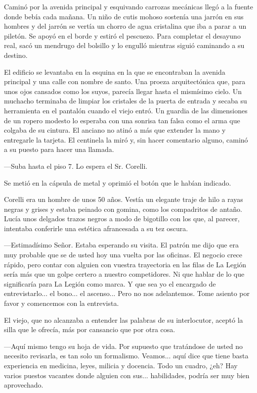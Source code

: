\documentclass[11pt,twoside,openright,a5paper]{book}
\begin{document}
Caminó por la avenida principal y esquivando carrozas mecánicas llegó a la fuente donde bebía cada mañana. Un niño de cutis mohoso sostenía una jarrón en sus hombres y del jarrón se vertía un chorro de agua cristalina que iba a parar a un piletón. Se apoyó en el borde y estiró el pescuezo. Para completar el desayuno real, sacó un mendrugo del bolsillo y lo engulló mientras siguió caminando a su destino.

El edificio se levantaba en la esquina en la que se encontraban la avenida principal y una calle con nombre de santo. Una proeza arquitectónica que, para unos ojos cansados como los suyos, parecía llegar hasta el mismísimo cielo. Un muchacho terminaba de limpiar los cristales de la puerta de entrada y secaba su herramienta en el pantalón cuando el viejo entró. Un guardia de las dimensiones de un ropero modesto lo esperaba con una sonrisa tan falsa como el arma que colgaba de su cintura. El anciano no atinó a más que extender la mano y entregarle la tarjeta. El centinela la miró y, sin hacer comentario alguno, caminó a su puesto para hacer una llamada.

---Suba hasta el piso 7. Lo espera el Sr. Corelli.

Se metió en la cápsula de metal y oprimió el botón que le habían indicado.

Corelli era un hombre de unos 50 años. Vestía un elegante traje de hilo a rayas negras y grises y estaba peinado con gomina, como los compadritos de antaño. Lucía unos delgados trazos negros a modo de bigotillo con los que, al parecer, intentaba conferirle una estética afrancesada a su tez oscura.

---Estimadísimo Señor. Estaba esperando su visita. El patrón me dijo que era muy probable que se de usted hoy una vuelta por las oficinas. El negocio crece rápido, pero contar con alguien con vuestra trayectoria en las filas de La Legión sería más que un golpe certero a nuestro competidores. Ni que hablar de lo que significaría para La Legión como marca. Y que sea yo el encargado de entrevistarlo... el bono... el ascenso... Pero no nos adelantemos. Tome asiento por favor y comencemos con la entrevista.

El viejo, que no alcanzaba a entender las palabras de su interlocutor, aceptó la silla que le ofrecía, más por cansancio que por otra cosa.

---Aquí mismo tengo su hoja de vida. Por supuesto que tratándose de usted no necesito revisarla, es tan solo un formalismo. Veamos... aquí dice que tiene basta experiencia en medicina, leyes, milicia y docencia. Todo un cuadro, ¿eh? Hay varios puestos vacantes donde alguien con sus... habilidades, podría ser muy bien aprovechado.
\end{document}
